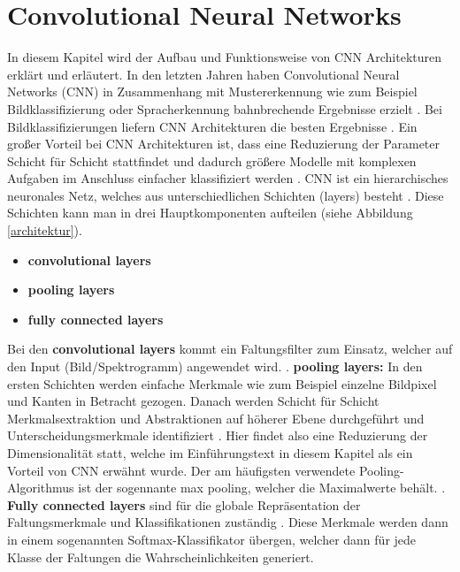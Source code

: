 \chapter{Convolutional Neural Networks}
In diesem Kapitel wird der Aufbau und Funktionsweise von CNN Architekturen erklärt und erläutert.\newline\newline
In den letzten Jahren haben Convolutional Neural Networks (CNN) in Zusammenhang mit Mustererkennung wie zum Beispiel Bildklassifizierung oder Spracherkennung bahnbrechende Ergebnisse erzielt \cite{bilderkennung}. Bei Bildklassifizierungen liefern CNN Architekturen die besten Ergebnisse \cite{imagenet}. Ein großer Vorteil bei CNN Architekturen ist, dass eine Reduzierung der Parameter Schicht für Schicht stattfindet und dadurch größere Modelle mit komplexen Aufgaben im Anschluss einfacher klassifiziert werden \cite{bilderkennung}. CNN ist ein hierarchisches neuronales Netz, welches aus unterschiedlichen Schichten (layers) besteht \cite{badshah2019deep}. Diese Schichten kann man in drei Hauptkomponenten aufteilen (siehe Abbildung \ref{architektur}).
\begin{itemize}
	\item  \textbf{convolutional layers} \cite{badshah2019deep} 
	\item  \textbf{pooling layers} \cite{badshah2019deep}
	\item  \textbf{fully connected layers} \cite{badshah2019deep}
\end{itemize}

Bei den \textbf{convolutional layers} kommt ein Faltungsfilter zum Einsatz, welcher auf den Input (Bild/Spektrogramm) angewendet wird. \cite{badshah2019deep}.\newline 
\textbf{pooling layers:} In den ersten Schichten werden einfache Merkmale wie zum Beispiel einzelne Bildpixel und Kanten in Betracht gezogen. Danach werden Schicht für Schicht Merkmalsextraktion und Abstraktionen auf höherer Ebene durchgeführt und Unterscheidungsmerkmale identifiziert \cite{badshah2019deep}. Hier findet also eine Reduzierung der Dimensionalität statt, welche im Einführungstext in diesem Kapitel als ein Vorteil von CNN erwähnt wurde. Der am häufigsten verwendete Pooling-Algorithmus ist der sogennante max pooling, welcher die Maximalwerte behält. \cite{badshah2019deep}.\newline \newline
\textbf{Fully connected layers} sind für die globale Repräsentation der Faltungsmerkmale und Klassifikationen zuständig \cite{badshah2019deep}. Diese Merkmale werden dann in einem sogenannten Softmax-Klassifikator übergen, welcher dann für jede Klasse der Faltungen die Wahrscheinlichkeiten generiert. 
